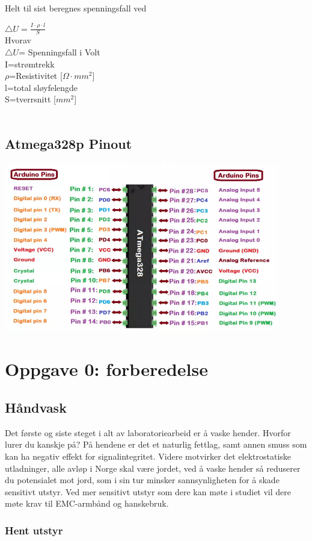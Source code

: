 \documentclass{article}
\begin{document}
Helt til sist beregnes spenningsfall ved

$\triangle U=\frac{I\cdot \rho \cdot l}{S}$\\
Hvorav\\
$\triangle U$= Spenningsfall i Volt\\
I=strømtrekk\\
$\rho$=Resistivitet [$\Omega \cdot mm^2$]\\
l=total sløyfelengde\\
S=tverrsnitt [$mm^2$]\\
\\
\subsection*{Atmega328p Pinout}
\includegraphics[width=0.9\textwidth]{bilder/Atmega pinout.png}
\newpage
\section*{Oppgave 0: forberedelse}
\subsection*{Håndvask}
Det første og siste steget i alt av laboratoriearbeid er å vaske hender. Hvorfor lurer du kanskje på? På hendene er det et naturlig fettlag, samt annen smuss som kan ha negativ effekt for signalintegritet. Videre motvirker det elektrostatiske utladninger, alle avløp i Norge skal være jordet, ved å vaske hender så reduserer du potensialet mot jord, som i sin tur minsker sannsynligheten for å skade sensitivt utstyr. Ved mer sensitivt utstyr som dere kan møte i studiet vil dere møte krav til EMC-armbånd og hanskebruk.
\subsubsection*{Hent utstyr}
\end{document}
